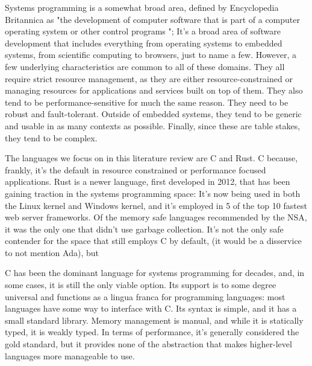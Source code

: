 \documentclass[conference]{IEEEtran}
\begin{document}

Systems programming is a somewhat broad area, defined by Encyclopedia Britannica as "the development of computer software that is part of a computer operating system or other control programs "\cite{SystemsProgrammingDefinition}; It's a broad area of software development that includes everything from operating systems to embedded systems, from scientific computing to browsers, just to name a few. However, a few underlying characteristics are common to all of these domains. They all require strict resource management, as they are either resource-constrained or managing resources for applications and services built on top of them. They also tend to be performance-sensitive for much the same reason. They need to be robust and fault-tolerant. Outside of embedded systems, they tend to be generic and usable in as many contexts as possible. Finally, since these are table stakes, they tend to be complex.

The languages we focus on in this literature review are C and Rust. C because, frankly, it's the default in resource constrained or performance focused applications. Rust is a newer language, first developed in 2012, that has been gaining traction in the systems programming space: It's now being used in both the Linux kernel and Windows kernel, and it's employed in 5 of the top 10 fastest web server frameworks. Of the memory safe languages recommended by the NSA, it was the only one that didn't use garbage collection. It's not the only safe contender for the space that still employs C by default, (it would be a disservice to not mention Ada), but

C has been the dominant language for systems programming for decades, and, in some cases, it is still the only viable option. Its support is to some degree universal and functions as a lingua franca for programming languages: most languages have some way to interface with C. Its syntax is simple, and it has a small standard library. Memory management is manual, and while it is statically typed, it is weakly typed. In terms of performance, it's generally considered the gold standard, but it provides none of the abstraction that makes higher-level languages more manageable to use.
\end{document}
